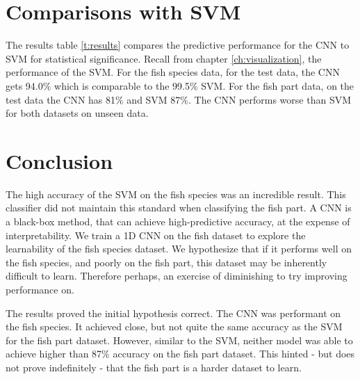 \section{Comparisons with SVM}

The results table \ref{t:results} compares the predictive performance for the CNN to SVM for statistical significance. Recall from chapter \ref{ch:visualization}, the performance of the SVM. For the fish species data, for the test data, the CNN gets 94.0\% which is comparable to the 99.5\% SVM. For the fish part data, on the test data the CNN has 81\% and SVM 87\%. The CNN performs worse than SVM for both datasets on unseen data.

\section{Conclusion}

The high accuracy of the SVM on the fish species was an incredible result. This classifier did not maintain this standard when classifying the fish part. A CNN is a black-box method, that can achieve high-predictive accuracy, at the expense of interpretability. We train a 1D CNN on the fish dataset to explore the learnability of the fish species dataset. We hypothesize that if it performs well on the fish species, and poorly on the fish part, this dataset may be inherently difficult to learn. Therefore perhaps, an exercise of diminishing to try improving performance on.

The results proved the initial hypothesis correct. The CNN was performant on the fish species. It achieved close, but not quite the same accuracy as the SVM for the fish part dataset. However, similar to the SVM, neither model was able to achieve higher than 87\% accuracy on the fish part dataset. This hinted - but does not prove indefinitely - that the fish part is a harder dataset to learn.

